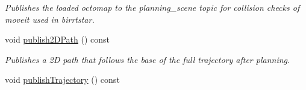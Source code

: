 \begin{DoxyCompactItemize}
\begin{DoxyCompactList}\small\item\em Publishes the loaded octomap to the planning\-\_\-scene topic for collision checks of moveit used in birrtstar. \end{DoxyCompactList}\item 
\hypertarget{classSquirrelMotionPlanner_1_1Planner_a2db0a451251d3af7380020a6a2fca628}{void \hyperlink{classSquirrelMotionPlanner_1_1Planner_a2db0a451251d3af7380020a6a2fca628}{publish2\-D\-Path} () const }\label{classSquirrelMotionPlanner_1_1Planner_a2db0a451251d3af7380020a6a2fca628}

\begin{DoxyCompactList}\small\item\em Publishes a 2\-D path that follows the base of the full trajectory after planning. \end{DoxyCompactList}\item 
\hypertarget{classSquirrelMotionPlanner_1_1Planner_adad08aeca16028ef57963993215698e4}{void \hyperlink{classSquirrelMotionPlanner_1_1Planner_adad08aeca16028ef57963993215698e4}{publish\-Trajectory} () const }\label{classSquirrelMotionPlanner_1_1Planner_adad08aeca16028ef57963993215698e4}


\end{DoxyCompactItemize}

